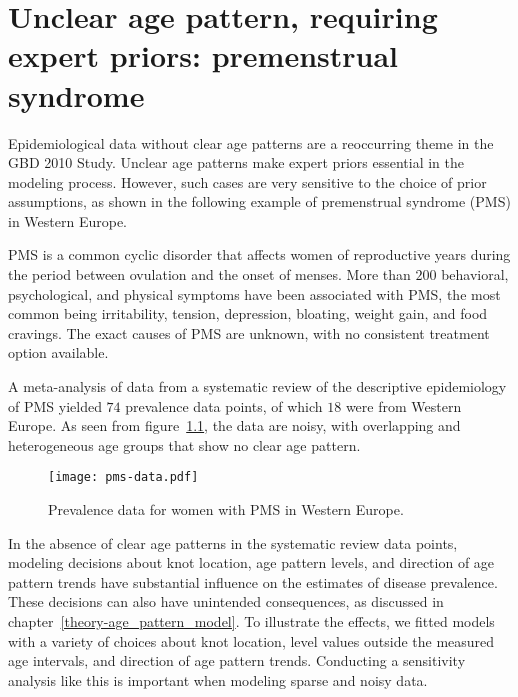 \chapter{Unclear age pattern, requiring expert priors: premenstrual syndrome}
\label{applications-priors_knots_select}

Epidemiological data without clear age patterns are a reoccurring
theme in the GBD 2010 Study.  Unclear age patterns make expert priors
essential in the modeling process.  However, such cases are very
sensitive to the choice of prior assumptions, as shown in the
following example of premenstrual syndrome (PMS) in Western Europe.

PMS is a common cyclic disorder that affects women of reproductive
years during the period between ovulation and the onset of menses.
More than $200$ behavioral, psychological, and physical symptoms have been
associated with PMS, the most common being irritability, tension,
depression, bloating, weight gain, and food cravings.  The exact causes
of PMS are unknown, with no consistent
treatment option available. \cite{dickerson_premenstrual_2003, singh_incidence_1998,
  goodale_alleviation_1990}

A meta-analysis of data from a systematic review of the descriptive
epidemiology of PMS yielded $74$ prevalence
data points, of which $18$ were from Western Europe.  As seen from
figure~\ref{fig:app-pms_data}, the data are noisy, with overlapping and
heterogeneous age groups that show no clear age pattern.

    \begin{figure}[h]
        \begin{center}
            \texttt{[image: pms-data.pdf]}
        \end{center}
        \caption{Prevalence data for women with PMS
              in Western Europe.}
        \label{fig:app-pms_data}
    \end{figure}


In the absence of clear age patterns in the systematic review data
points, modeling decisions about knot location, age pattern levels, and
direction of age pattern trends have substantial influence on the estimates of
disease prevalence.  These decisions can also have unintended
consequences, as discussed in chapter~\ref{theory-age_pattern_model}.
To illustrate the effects, we fitted models with a variety of choices
about knot location, level values outside the measured age
intervals, and direction of age pattern trends.  Conducting a sensitivity analysis
like this is important when modeling sparse and noisy data.

